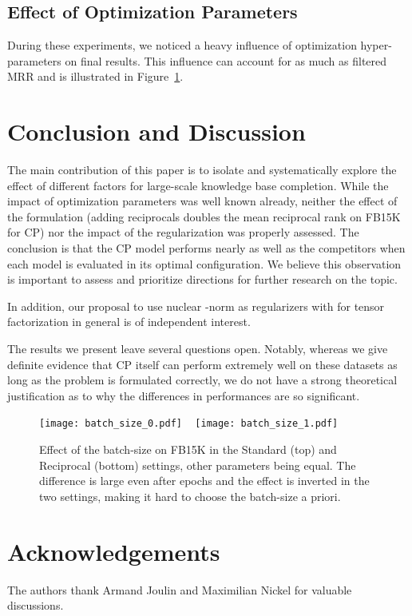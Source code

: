 \documentclass{article}
\newcommand{\CP}{{CP}\xspace}
\newcommand{\fb}{{FB15K}\xspace}
\begin{document}
\subsection{Effect of Optimization Parameters}

During these experiments, we noticed a heavy influence of optimization hyper-parameters on final results. This influence can account for as much as  filtered MRR and is illustrated in Figure~\ref{fig:optimization}.

\section{Conclusion and Discussion}
The main contribution of this paper is to isolate and systematically explore the effect of different factors for large-scale knowledge base completion. While the impact of optimization parameters was well known already, neither the effect of the formulation (adding reciprocals doubles the mean reciprocal rank on \fb for \CP) nor the impact of the regularization was properly assessed. The conclusion is that the \CP model performs nearly as well as the competitors when each model is evaluated in its optimal configuration. We believe this observation is important to assess and prioritize directions for further research on the topic. 

In addition, our proposal to use nuclear -norm as regularizers with  for tensor factorization in general is of independent interest. 

The results we present leave several questions open. Notably, whereas we give definite evidence that \CP itself can perform extremely well on these datasets as long as the problem is formulated correctly, we do not have a strong theoretical justification as to why the differences in performances are so significant.

\begin{figure}
\centering
\texttt{[image: batch\_size\_0.pdf]}
~
\texttt{[image: batch\_size\_1.pdf]}
\caption{Effect of the batch-size on \fb in the Standard (top) and Reciprocal (bottom) settings, other parameters being equal. The difference is large even after  epochs and the effect is inverted in the two settings, making it hard to choose the batch-size a priori.
}
\label{fig:optimization}
\end{figure}

\section*{Acknowledgements}
The authors thank Armand Joulin and Maximilian Nickel for valuable discussions.
\end{document}
